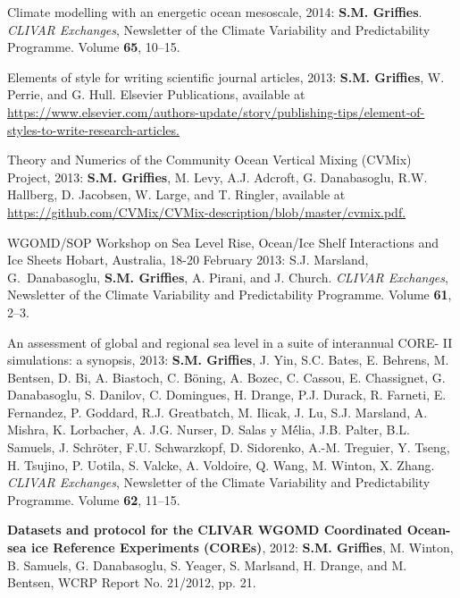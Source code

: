 \begin{etaremune}
\item Climate modelling with an energetic ocean mesoscale, 2014: {\bf
    S.M. Grif\/f\/ies}.  {\em CLIVAR Exchanges}, Newsletter of the
  Climate Variability and Predictability Programme.  Volume {\bf 65},
  10--15.

\item Elements of style for writing scientific journal articles, 2013:
  {\bf S.M. Grif\/f\/ies}, W. Perrie, and G. Hull. Elsevier
  Publications, available at \href{https://www.elsevier.com/authors-update/story/publishing-tips/element-of-styles-to-write-research-articles}{https://www.elsevier.com/authors-update/story/publishing-tips/element-of-styles-to-write-research-articles.}

\item Theory and Numerics of the Community Ocean Vertical Mixing
  (CVMix) Project, 2013: {\bf S.M. Grif\/f\/ies}, M. Levy, A.J. Adcroft,
  G. Danabasoglu, R.W. Hallberg, D. Jacobsen, W. Large, and
  T. Ringler, available at \href{https://github.com/CVMix/CVMix-description/blob/master/cvmix.pdf}{https://github.com/CVMix/CVMix-description/blob/master/cvmix.pdf.}

\item WGOMD/SOP Workshop on Sea Level Rise, Ocean/Ice Shelf
  Interactions and Ice Sheets Hobart, Australia, 18-20 February 2013:
  S.J. Marsland, G.\ Danabasoglu, {\bf S.M. Grif\/f\/ies}, A. Pirani,
  and J. Church.  {\em CLIVAR Exchanges}, Newsletter of the Climate
  Variability and Predictability Programme.  Volume {\bf 61}, 2--3.

\item An assessment of global and regional sea level in a suite of
  interannual CORE- II simulations: a synopsis, 2013: {\bf
    S.M. Grif\/f\/ies}, J. Yin, S.C. Bates, E. Behrens, M.  Bentsen,
  D. Bi, A. Biastoch, C. B\"{o}ning, A. Bozec, C. Cassou,
  E. Chassignet, G. Danabasoglu, S. Danilov, C. Domingues, H. Drange,
  P.J. Durack, R. Farneti, E. Fernandez, P. Goddard, R.J. Greatbatch,
  M. Ilicak, J. Lu, S.J. Marsland, A. Mishra, K. Lorbacher,
  A. J.G. Nurser, D. Salas y M\'{é}lia, J.B. Palter, B.L. Samuels,
  J. Schr\"{o}ter, F.U. Schwarzkopf, D. Sidorenko, A.-M. Treguier,
  Y. Tseng, H. Tsujino, P.  Uotila, S. Valcke, A. Voldoire, Q. Wang,
  M. Winton, X. Zhang. {\em CLIVAR Exchanges}, Newsletter of the
  Climate Variability and Predictability Programme. Volume {\bf 62},
  11--15.

\item {\bf Datasets and protocol for the CLIVAR WGOMD Coordinated
    Ocean-sea ice Reference Experiments (COREs)}, 2012: {\bf
    S.M. Grif\/f\/ies}, M. Winton, B. Samuels, G. Danabasoglu,
  S. Yeager, S. Marlsand, H.  Drange, and M. Bentsen, WCRP Report
  No. 21/2012, pp. 21.


\end{etaremune}
